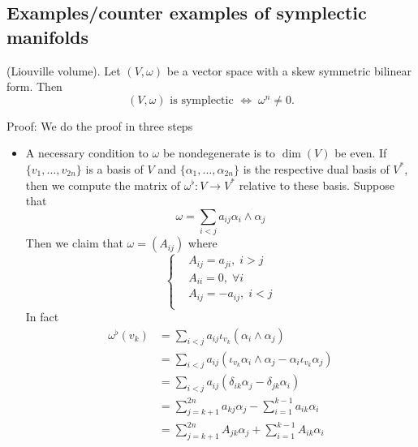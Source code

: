 \subsection{Examples/counter examples of symplectic manifolds}
\begin{dang}
    \begin{lemma}\label{lemma: Liouville volume}
        (Liouville volume).
        Let $(V, \omega)$ be a vector space with a skew symmetric bilinear form. Then 
\begin{equation}
    (V,\omega)\text{ is symplectic }\iff\;\omega^n\neq 0.
\end{equation}
    \end{lemma}
\end{dang}
Proof: We do the proof in three steps
\begin{itemize}
    \item A necessary condition to $\omega$ be nondegenerate is to $\dim(V)$ be even. If $\{v_1,\dots,v_{2n}\}$ is a 
    basis of $V$ and $\{\alpha_1,\dots,\alpha_{2n}\}$ is the respective dual basis of $V^*$, then we compute the matrix 
    of $\omega^\flat: V\to V^*$ relative to these basis. Suppose that 
    \begin{equation}
        \omega = \sum_{i<j}a_{ij}\alpha_i\wedge\alpha_j
    \end{equation}
    Then we claim that $\omega=(A_{ij})$ where 
    \begin{equation}
       \left\{ \begin{aligned}
            &A_{ij}=a_{ji},\;i>j\\
            &A_{ii}=0,\;\forall i\\
            &A_{ij}=-a_{ij},\;i<j\\
        \end{aligned}\right.
    \end{equation}
    In fact
    \begin{equation}
        \begin{split}
            \omega^\flat(v_k)&=\sum_{i<j}a_{ij}\iota_{v_k}(\alpha_i\wedge\alpha_j)\\
            &=\sum_{i<j}a_{ij}(\iota_{v_k}\alpha_i\wedge\alpha_j-\alpha_i\iota_{v_k}\alpha_j)\\
            &=\sum_{i<j}a_{ij}(\delta_{ik}\alpha_j-\delta_{jk}\alpha_i)\\
            &=\sum_{j=k+1}^{2n}a_{kj}\alpha_j-\sum_{i=1}^{k-1}a_{ik}\alpha_i\\
            &=\sum_{j=k+1}^{2n}A_{jk}\alpha_j+\sum_{i=1}^{k-1}A_{ik}\alpha_i\\

\end{split}
\end{equation}
\end{itemize}
